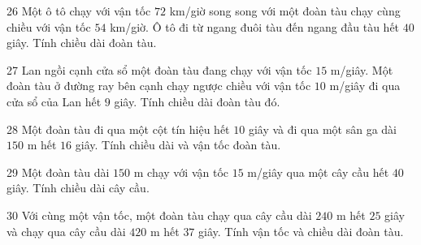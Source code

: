 \gap
\begin{probbox}{26}{\relax}
Một ô tô chạy với vận tốc $72$ km/giờ song song với một đoàn tàu chạy cùng chiều với vận tốc $54$ km/giờ. Ô tô đi từ ngang đuôi tàu đến ngang đầu tàu hết $40$ giây. Tính chiều dài đoàn tàu.
\end{probbox}
\gap
\begin{probbox}{27}{\relax}
Lan ngồi cạnh cửa sổ một đoàn tàu đang chạy với vận tốc $15$ m/giây. Một đoàn tàu ở đường ray bên cạnh chạy ngược chiều với vận tốc $10$ m/giây đi qua cửa sổ của Lan hết $9$ giây. Tính chiều dài đoàn tàu đó.
\end{probbox}
\gap
\begin{probbox}{28}{\relax}
Một đoàn tàu đi qua một cột tín hiệu hết $10$ giây và đi qua một sân ga dài $150$ m hết $16$ giây. Tính chiều dài và vận tốc đoàn tàu.
\end{probbox}
\gap
\begin{probbox}{29}{\relax}
Một đoàn tàu dài $150$ m chạy với vận tốc $15$ m/giây qua một cây cầu hết $40$ giây. Tính chiều dài cây cầu.
\end{probbox}
\gap
\begin{probbox}{30}{\relax}
Với cùng một vận tốc, một đoàn tàu chạy qua cây cầu dài $240$ m hết $25$ giây và chạy qua cây cầu dài $420$ m hết $37$ giây. Tính vận tốc và chiều dài đoàn tàu.
\end{probbox}
